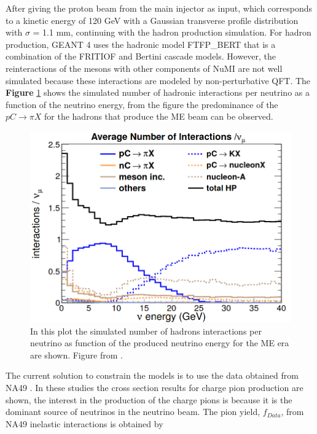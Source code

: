 After giving the proton beam from the main injector as input, which corresponds to a kinetic energy of 120 GeV with a Gaussian transverse profile distribution with $\sigma$ = 1.1 mm, continuing with the hadron production simulation. For hadron production, GEANT 4 uses the hadronic model FTFP\_BERT that is a combination of the FRITIOF \cite{PhysRevD.90.032001} and Bertini \cite{BERTINI1971670} \cite{GUTHRIE196829} cascade models. However, the reinteractions of the mesons with other components of NuMI are not well simulated because these interactions are modeled by non-perturbative QFT. The \textbf{Figure} \ref{fig:Simulation:Beam:HadIntperNu} shows the simulated number of hadronic interactions per neutrino as a function of the neutrino energy, from the figure the predominance of the $pC\rightarrow\pi X$ for the hadrons that produce the ME beam can be observed. 

\begin{figure}[!htb]
    \centering
    \includegraphics[scale=0.3]{Figures/Chapter3/HadronicInteractions.png}
    \caption{In this plot the simulated number of hadrons interactions per neutrino as function of the produced neutrino energy for the ME era are shown. Figure from \cite{LeoThesis}.}
    \label{fig:Simulation:Beam:HadIntperNu}
\end{figure}

The current solution to constrain the models is to use the data obtained from NA49 \cite{NA49}. In these studies \cite{NA49} the cross section results for charge pion production are shown, the interest in the production of the charge pions is because it is the dominant source of neutrinos in the neutrino beam. The pion yield, $f_{Data}$, from NA49 inelastic interactions is obtained by

